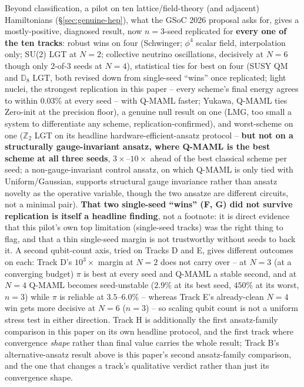 \documentclass[11pt]{article}
\begin{document}
Beyond classification, a pilot on ten lattice/field-theory (and adjacent) Hamiltonians
(\S\ref{sec:genuine-hep}), what the GSoC 2026 proposal asks for, gives a mostly-positive, diagnosed result,
now $n{=}3$-seed replicated for \textbf{every one of the ten tracks}: robust wins on four (Schwinger;
$\phi^4$ scalar field, interpolation only; SU(2) LGT at $N{=}2$; collective neutrino oscillations,
decisively at $N{=}6$ though only 2-of-3 seeds at $N{=}4$), statistical ties for best on four (SUSY QM and
$\mathbb{D}_8$ LGT, both revised down from single-seed ``wins'' once replicated; light nuclei, the
strongest replication in this paper -- every scheme's final energy agrees to within 0.03\% at
every seed -- with Q-MAML faster; Yukawa, Q-MAML ties Zero-init at the precision floor), a genuine null
result on one (LMG, too small a system to differentiate any scheme, replication-confirmed), and
worst-scheme on one ($\mathbb{Z}_2$ LGT on its headline hardware-efficient-ansatz protocol -- \textbf{but
not on a structurally gauge-invariant ansatz, where Q-MAML is the best scheme at all three seeds},
$3\times$--$10\times$ ahead of the best classical scheme per seed; a non-gauge-invariant control ansatz, on
which Q-MAML is only tied with Uniform/Gaussian, supports structural gauge invariance rather than ansatz
novelty as the operative variable, though the two ansatze are different circuits, not a minimal pair).
\textbf{That two single-seed ``wins'' (F, G) did not survive replication is itself a headline finding}, not
a footnote: it is direct evidence that this pilot's own top limitation (single-seed tracks) was the right
thing to flag, and that a thin single-seed margin is not trustworthy without seeds to back it. A second
qubit-count axis, tried on Tracks D and E, gives different outcomes on each: Track D's $10^3\times$ margin
at $N{=}2$ does not carry over -- at $N{=}3$ (at a converging budget) $\pi$ is best at every seed and Q-MAML a stable second, and at $N{=}4$
Q-MAML becomes seed-unstable ($2.9\%$ at its best seed, $450\%$ at its worst, $n{=}3$) while $\pi$ is
reliable at $3.5$--$6.0\%$ -- whereas Track E's already-clean $N{=}4$ win gets more decisive at $N{=}6$
($n{=}3$) -- so scaling qubit count is not a uniform stress test in either direction. Track H is
additionally the first ansatz-family comparison in this paper on
its own headline protocol, and the first track where convergence \emph{shape} rather than final value
carries the whole result; Track B's alternative-ansatz result above is this paper's second ansatz-family
comparison, and the one that changes a track's qualitative verdict rather than just its convergence shape.
\end{document}
